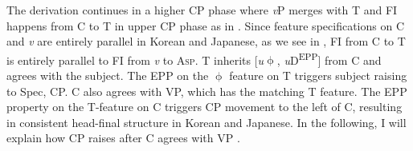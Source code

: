 \ex \label{ex:161}
\z

The derivation continues in a higher \ac{CP} phase where \textit{v}P merges with T and \ac{FI} happens from C to T in upper \ac{CP} phase as in . Since feature specifications on C and \textit{v} are entirely parallel in Korean and Japanese, as we see in , \ac{FI} from C to T is entirely parallel to \ac{FI} from \textit{v} to A\textsc{sp.} \textsc{T} inherits [\textit{u}$\upphi$, \textit{u}D\textsuperscript{\ac{EPP}}] from C and agrees with the subject. The \ac{EPP} on the $\upphi$ feature on T triggers subject raising to Spec, \ac{CP}. C also agrees with VP, which has the matching T feature. The \ac{EPP} property on the T-feature on C triggers \ac{CP} movement to the left of C, resulting in consistent head-final structure in Korean and Japanese. In the following, I will explain how \ac{CP} raises after C agrees with \ac{VP} .

\ea\label{ex:162}

